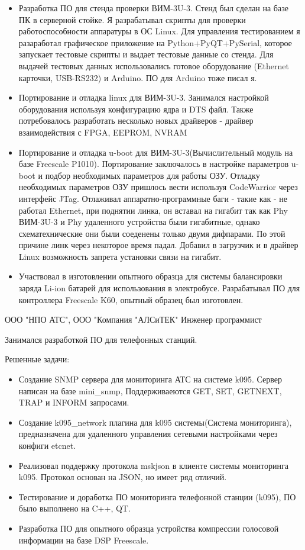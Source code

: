{\begin{itemize}
\item{Разработка ПО для стенда проверки ВИМ-3U-3. Стенд был сделан на базе ПК в серверной стойке. Я разрабатывал скрипты для проверки работоспособности аппаратуры в ОС Linux. Для управления тестированием я разаработал графическое приложение на Python+PyQT+PySerial, которое запускает тестовые скрипты и выдает тестовые данные со стенда. Для выдачей тестовых данных использовались готовое оборудование (Ethernet карточки, USB-RS232) и Arduino. ПО для Arduino тоже писал я.}
\item{Портирование и отладка linux для ВИМ-3U-3. Занимался настройкой оборудования используя конфигурацию ядра и DTS файл. Также потребовалось разработать несколько новых драйверов - драйвер взаимодействия с FPGA, EEPROM, NVRAM }
\item Портирование и отладка u-boot для ВИМ-3U-3(Вычислительный модуль на базе Freescale P1010). Портирование заключалось в настройке параметров u-boot и подбор необходимых параметров для работы ОЗУ. Отладку необходимых параметров ОЗУ пришлось вести используя CodeWarrior через интерфейс JTag. Отлаживал аппаратно-программные баги - такие как - не работал Ethernet, при поднятии линка, он вставал на гигабит так как Phy ВИМ-3U-3 и Phy удаленного устройства были гигабитные, однако схематехнические они были соеденены только двумя дифпарами. По этой причине линк через некоторое время падал. Добавил в загрузчик и в драйвер Linux возможность запрета установки связи на гигабит.
\item{Участвовал в изготовлении опытного образца для системы балансировки заряда Li-ion батарей для использования в электробусе. Разрабатывал ПО для контроллера Freescale K60, опытный образец был изготовлен.}
\end{itemize}
}


\jobdetail
{ООО "НПО АТС", ООО "Компания "АЛСиТЕК"}
{Инженер программист}
{Занимался разработкой ПО для телефонных станций.

Решенные задачи:
\begin{itemize}
\item{Создание SNMP сервера для мониторинга АТС на системе k095. Сервер написан на базе mini\_snmp, Поддерживаеются GET, SET, GETNEXT, TRAP и INFORM запросами.}
\item{Создание k095\_network плагина для k095 системы(Система мониторинга), предназначена для удаленного управления сетевыми настройками через конфиги etcnet. }
\item{Реализовал поддержку протокола mskjson в клиенте системы мониторинга k095. Протокол основан на JSON, но имеет ряд отличий.}
\item{Тестирование и доработка ПО мониторинга телефонной станции (k095), ПО было выполнено на C++, QT.}
\item{Разработка ПО для опытного образца устройства компрессии голосовой информации на базе DSP Freescale.}
\end{itemize}
}

